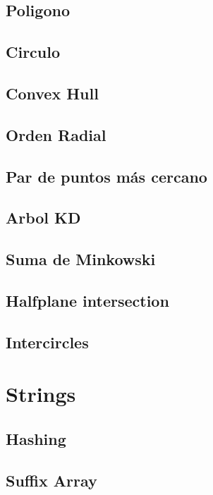 \documentclass[a4paper,10pt,twocolumn]{article}
\begin{document}
\subsection{Poligono}

\subsection{Circulo}

\subsection{Convex Hull}

\subsection{Orden Radial}

\subsection{Par de puntos más cercano}

\subsection{Arbol KD}

\subsection{Suma de Minkowski}

\subsection{Halfplane intersection}

\subsection{Intercircles}


\section{Strings} %
\subsection{Hashing}

\subsection{Suffix Array}

\end{document}
